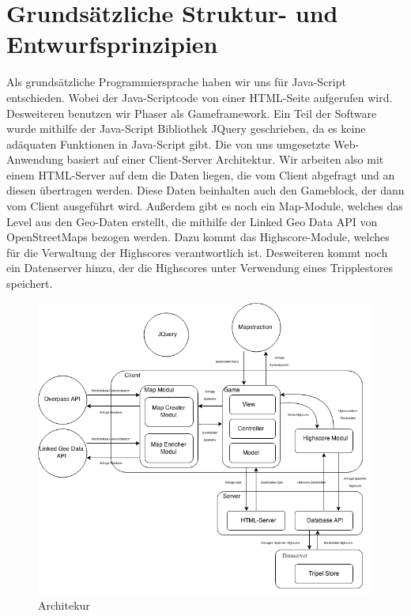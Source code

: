 \documentclass[11pt,a4paper]{article}
\begin{document}
\section{Grundsätzliche Struktur- und Entwurfsprinzipien}
Als grundsätzliche Programmiersprache haben wir uns für Java-Script entschieden. Wobei der Java-Scriptcode von einer HTML-Seite aufgerufen wird. Desweiteren benutzen wir Phaser als Gameframework.
Ein Teil der Software wurde mithilfe der Java-Script Bibliothek JQuery geschrieben, da es keine adäquaten Funktionen in Java-Script gibt. 
Die von uns umgesetzte Web-Anwendung basiert auf einer Client-Server Architektur. Wir arbeiten also mit einem HTML-Server auf dem die Daten liegen, die vom Client abgefragt und an diesen übertragen werden. Diese Daten beinhalten auch den Gameblock, der dann vom Client ausgeführt wird. Außerdem gibt es noch ein Map-Module, welches das Level aus den Geo-Daten erstellt, die mithilfe der Linked Geo Data API von OpenStreetMaps bezogen werden. Dazu kommt das Highscore-Module, welches für die Verwaltung der Highscores verantwortlich ist. Desweiteren kommt noch ein Datenserver hinzu, der die Highscores unter Verwendung eines Tripplestores speichert.\\
\begin{figure}[htb]
  \centering
  \includegraphics[scale=0.4]{arch_new.png}
\caption{Architekur}
  \label{arch}
\end{figure} 
\end{document}
